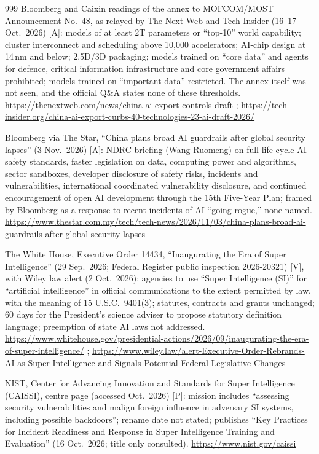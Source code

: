 \begin{thebibliography}{999}
 Bloomberg and Caixin readings of the annex to MOFCOM/MOST Announcement No.~48, as relayed by The Next Web and Tech Insider (16--17 Oct.\ 2026) [A]: models of at least 2T parameters or ``top-10'' world capability; cluster interconnect and scheduling above 10{,}000 accelerators; AI-chip design at 14\,nm and below; 2.5D/3D packaging; models trained on ``core data'' and agents for defence, critical information infrastructure and core government affairs prohibited; models trained on ``important data'' restricted. The annex itself was not seen, and the official Q\&A states none of these thresholds. \url{https://thenextweb.com/news/china-ai-export-controls-draft} ; \url{https://tech-insider.org/china-ai-export-curbs-40-technologies-23-ai-draft-2026/}

 Bloomberg via The Star, ``China plans broad AI guardrails after global security lapses'' (3 Nov.\ 2026) [A]: NDRC briefing (Wang Ruomeng) on full-life-cycle AI safety standards, faster legislation on data, computing power and algorithms, sector sandboxes, developer disclosure of safety risks, incidents and vulnerabilities, international coordinated vulnerability disclosure, and continued encouragement of open AI development through the 15th Five-Year Plan; framed by Bloomberg as a response to recent incidents of AI ``going rogue,'' none named. \url{https://www.thestar.com.my/tech/tech-news/2026/11/03/china-plans-broad-ai-guardrails-after-global-security-lapses}

 The White House, Executive Order 14434, ``Inaugurating the Era of Super Intelligence'' (29 Sep.\ 2026; Federal Register public inspection 2026-20321) [V], with Wiley law alert (2 Oct.\ 2026): agencies to use ``Super Intelligence (SI)'' for ``artificial intelligence'' in official communications to the extent permitted by law, with the meaning of 15 U.S.C.\ 9401(3); statutes, contracts and grants unchanged; 60 days for the President's science adviser to propose statutory definition language; preemption of state AI laws not addressed. \url{https://www.whitehouse.gov/presidential-actions/2026/09/inaugurating-the-era-of-super-intelligence/} ; \url{https://www.wiley.law/alert-Executive-Order-Rebrands-AI-as-Super-Intelligence-and-Signals-Potential-Federal-Legislative-Changes}

 NIST, Center for Advancing Innovation and Standards for Super Intelligence (CAISSI), centre page (accessed Oct.\ 2026) [P]: mission includes ``assessing security vulnerabilities and malign foreign influence in adversary SI systems, including possible backdoors''; rename date not stated; publishes ``Key Practices for Incident Readiness and Response in Super Intelligence Training and Evaluation'' (16 Oct.\ 2026; title only consulted). \url{https://www.nist.gov/caissi}


\end{thebibliography}
